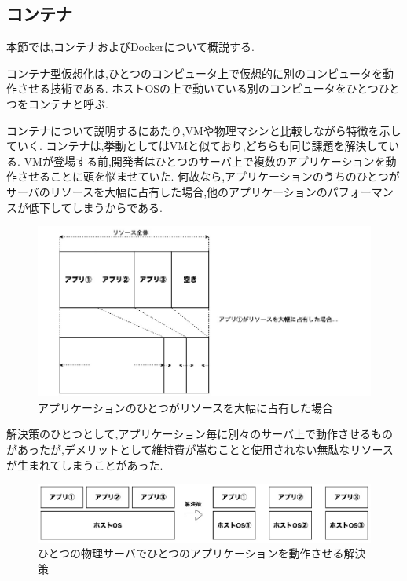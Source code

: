 \subsection{コンテナ}
\label{background:container-orchestration-system:container}

本節では,コンテナおよびDockerについて概説する.

コンテナ型仮想化は,ひとつのコンピュータ上で仮想的に別のコンピュータを動作させる技術である.
ホストOSの上で動いている別のコンピュータをひとつひとつをコンテナと呼ぶ.

コンテナについて説明するにあたり,VMや物理マシンと比較しながら特徴を示していく.
コンテナは,挙動としてはVMと似ており,どちらも同じ課題を解決している.
VMが登場する前,開発者はひとつのサーバ上で複数のアプリケーションを動作させることに頭を悩ませていた.
何故なら,アプリケーションのうちのひとつがサーバのリソースを大幅に占有した場合,他のアプリケーションのパフォーマンスが低下してしまうからである.

\begin{figure}[htbp]
\begin{center}
    \includegraphics[width=\textwidth]{./figures/resource-on-physical-server.jpg}
    \caption{アプリケーションのひとつがリソースを大幅に占有した場合}
\end{center}
\end{figure}

解決策のひとつとして,アプリケーション毎に別々のサーバ上で動作させるものがあったが,デメリットとして維持費が嵩むことと使用されない無駄なリソースが生まれてしまうことがあった.

\begin{figure}[htbp]
\begin{center}
    \includegraphics[width=\textwidth]{./figures/only-on-physical-server.jpg}
    \caption{ひとつの物理サーバでひとつのアプリケーションを動作させる解決策}
\end{center}
\end{figure}

